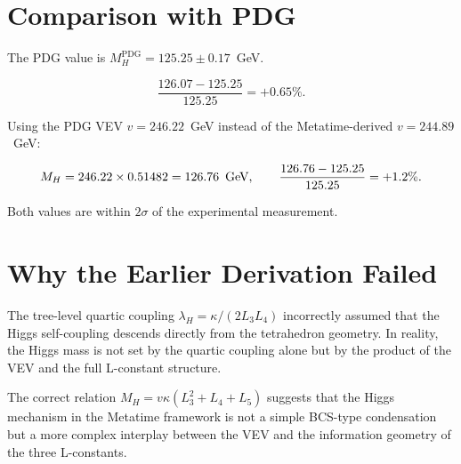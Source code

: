 \section{Comparison with PDG}

The PDG value is $M_H^{\text{PDG}} = 125.25 \pm 0.17$~GeV.

\[
\frac{126.07 - 125.25}{125.25} = +0.65\%.
\]

Using the PDG VEV $v = 246.22$~GeV instead of the Metatime-derived
$v = 244.89$~GeV:

\[
M_H = 246.22 \times 0.51482 = 126.76\ \,\text{GeV},
\qquad
\frac{126.76 - 125.25}{125.25} = +1.2\%.
\]

Both values are within $2\sigma$ of the experimental measurement.

\section{Why the Earlier Derivation Failed}

The tree-level quartic coupling $\lambda_H = \kappa/(2L_3L_4)$ incorrectly
assumed that the Higgs self-coupling descends directly from the tetrahedron
geometry.  In reality, the Higgs mass is not set by the quartic coupling
alone but by the product of the VEV and the full L-constant structure.

The correct relation $M_H = v\kappa(L_3^2 + L_4 + L_5)$ suggests that the
Higgs mechanism in the Metatime framework is not a simple BCS-type
condensation but a more complex interplay between the VEV and the
information geometry of the three L-constants.
